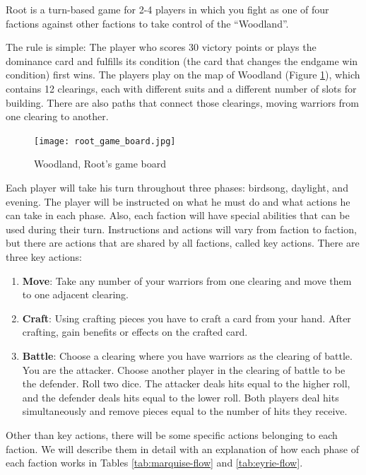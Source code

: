 Root is a turn-based game for 2-4 players in which you fight as one of four factions against other factions to take control of the ``Woodland''.

The rule is simple: The player who scores 30 victory points or plays the dominance card and fulfills its condition (the card that changes the endgame win condition) first wins. The players play on the map of Woodland (Figure \ref{fig:root-game-board}), which contains 12 clearings, each with different suits and a different number of slots for building. There are also paths that connect those clearings, moving warriors from one clearing to another.

\begin{figure}
  \begin{center}
    \texttt{[image: root\_game\_board.jpg]}
  \end{center}
  \caption{Woodland, Root's game board}
  \label{fig:root-game-board}
\end{figure}

Each player will take his turn throughout three phases: birdsong, daylight, and evening. The player will be instructed on what he must do and what actions he can take in each phase. Also, each faction will have special abilities that can be used during their turn. Instructions and actions will vary from faction to faction, but there are actions that are shared by all factions, called key actions. There are three key actions:

\begin{enumerate}
  \item \textbf{Move}: Take any number of your warriors from one clearing and move them to one adjacent clearing.
  \item \textbf{Craft}: Using crafting pieces you have to craft a card from your hand. After crafting, gain benefits or effects on the crafted card.
  \item \textbf{Battle}: Choose a clearing where you have warriors as the clearing of battle. You are the attacker. Choose another player in the clearing of battle to be the defender. Roll two dice. The attacker deals hits equal to the higher roll, and the defender deals hits equal to the lower roll. Both players deal hits simultaneously and remove pieces equal to the number of hits they receive.
\end{enumerate}

Other than key actions, there will be some specific actions belonging to each faction. We will describe them in detail with an explanation of how each phase of each faction works in Tables \ref{tab:marquise-flow} and \ref{tab:eyrie-flow}.

